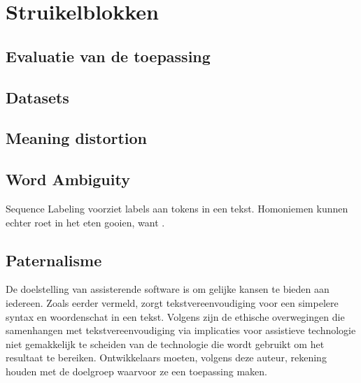 




\section{Struikelblokken}

\subsection{Evaluatie van de toepassing}

\subsection{Datasets}

\subsection{Meaning distortion}

\subsection{Word Ambiguity}

Sequence Labeling voorziet labels aan tokens in een tekst. Homoniemen kunnen echter roet in het eten gooien, want . 

\subsection{Paternalisme}
De doelstelling van assisterende software is om gelijke kansen te bieden aan iedereen. Zoals eerder vermeld, zorgt tekstvereenvoudiging voor een simpelere syntax en woordenschat in een tekst. Volgens \textcite{Niemeijer2010} zijn de ethische overwegingen die samenhangen met tekstvereenvoudiging via implicaties voor assistieve technologie niet gemakkelijk te scheiden van de technologie die wordt gebruikt om het resultaat te bereiken. Ontwikkelaars moeten, volgens deze auteur, rekening houden met de doelgroep waarvoor ze een toepassing maken.

